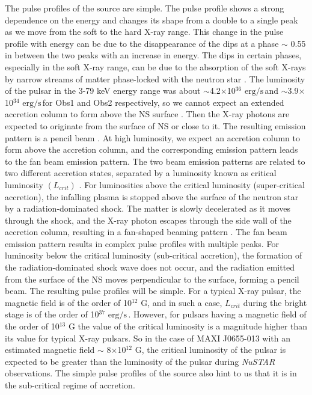 \documentclass[12pt,a4paper,fleqn,usenatbib]{mnras}
\newcommand{\unilum}{$\text{erg}/\text{s}\,$}
\begin{document}
 The pulse profiles of the source are simple. The pulse profile shows a strong dependence on the energy and changes its shape from a double to a single peak as we move from the soft to the hard X-ray range. This change in the pulse profile with energy can be due to the disappearance of the dips at a phase $\sim$ 0.55 in between the two peaks with an increase in energy. The dips in certain phases, especially in the soft X-ray range, can be due to the absorption of the soft X-rays by narrow streams of matter phase-locked with the neutron star \citep{2016MNRAS.457.2749J}. The luminosity of the pulsar in the 3-79 keV energy range was about $\sim$4.2$\times$10$^{36}$ \unilum and $\sim$3.9$\times$10$^{34}$ \unilum for Obs1 and Obs2 respectively, so we cannot expect an extended accretion column to form above the NS surface \citep{2015MNRAS.447.1847M,10.1093/mnras/stv2087}. Then the X-ray photons are expected to originate from the surface of NS or close to it. The resulting emission pattern is a pencil beam \citep{1976MNRAS.175..395B}. At high luminosity, we expect an accretion column to form above the accretion column, and the corresponding emission pattern leads to the fan beam emission pattern. The two beam emission patterns are related to two different accretion states, separated by a luminosity known as critical luminosity $(L_{crit})$ \citep{1976MNRAS.175..395B}.  For luminosities above the critical luminosity (super-critical accretion), the infalling plasma is stopped above the surface of the neutron star by a radiation-dominated shock. The matter is slowly decelerated as it moves through the shock, and the X-ray photon escapes through the side wall of the accretion column, resulting in a fan-shaped beaming pattern \citep{2012A&A...544A.123B}. The fan beam emission pattern results in complex pulse profiles with multiple peaks. For luminosity below the critical luminosity (sub-critical accretion), the formation of the radiation-dominated shock wave does not occur, and the radiation emitted from the surface of the NS moves perpendicular to the surface, forming a pencil beam. The resulting pulse profiles will be simple. For a typical X-ray pulsar, the magnetic field is of the order of 10$^{12}$ G, and in such a case, $L_{crit}$ during the bright stage is of the order of 10$^{37}$ \unilum \citep{2012A&A...544A.123B}. However, for pulsars having a magnetic field of the order of 10$^{13}$ G the value of the critical luminosity is a magnitude higher than its value for typical X-ray pulsars. So in the case of MAXI J0655-013 with an estimated magnetic field $\sim$ 8$\times$10$^{12}$ G, the critical luminosity of the pulsar is expected to be greater than the luminosity of the pulsar during \emph{NuSTAR} observations. The simple pulse profiles of the source also hint to us that it is in the sub-critical regime of accretion.
\end{document}
